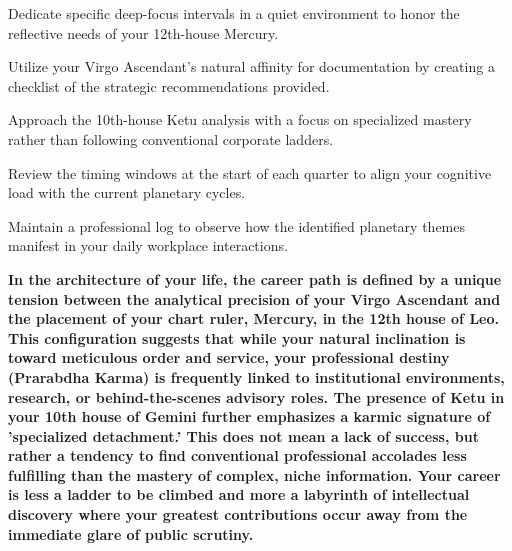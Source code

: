 \begin{diamondlist}
  \item {\fontsize{8.5}{12}\selectfont Dedicate specific deep-focus intervals in a quiet environment to honor the reflective needs of your 12th-house Mercury.}
  \item {\fontsize{8.5}{12}\selectfont Utilize your Virgo Ascendant's natural affinity for documentation by creating a checklist of the strategic recommendations provided.}
  \item {\fontsize{8.5}{12}\selectfont Approach the 10th-house Ketu analysis with a focus on specialized mastery rather than following conventional corporate ladders.}
  \item {\fontsize{8.5}{12}\selectfont Review the timing windows at the start of each quarter to align your cognitive load with the current planetary cycles.}
  \item {\fontsize{8.5}{12}\selectfont Maintain a professional log to observe how the identified planetary themes manifest in your daily workplace interactions.}
\end{diamondlist}


\label{topic5}

{\fontsize{9.5}{13.8}\selectfont\bfseries\color{DeepSlate} In the architecture of your life, the career path is defined by a unique tension between the analytical precision of your Virgo Ascendant and the placement of your chart ruler, Mercury, in the 12th house of Leo. This configuration suggests that while your natural inclination is toward meticulous order and service, your professional destiny (Prarabdha Karma) is frequently linked to institutional environments, research, or behind-the-scenes advisory roles. The presence of Ketu in your 10th house of Gemini further emphasizes a karmic signature of 'specialized detachment.' This does not mean a lack of success, but rather a tendency to find conventional professional accolades less fulfilling than the mastery of complex, niche information. Your career is less a ladder to be climbed and more a labyrinth of intellectual discovery where your greatest contributions occur away from the immediate glare of public scrutiny.}\par\vspace{2mm}

